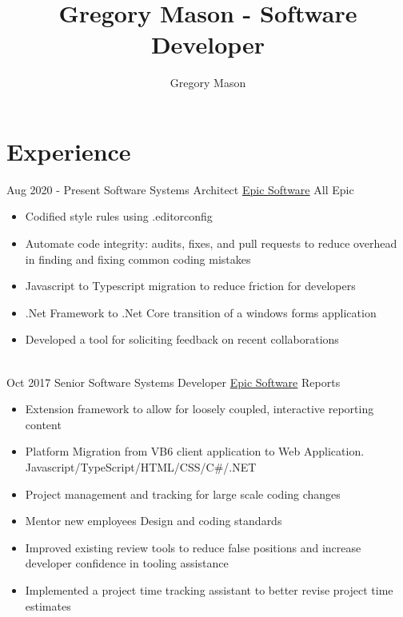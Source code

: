 \documentclass[letterpaper]{twentysecondcv} %
\author{Gregory Mason}
\title{Gregory Mason - Software Developer}
\begin{document}
\makeprofile %


\section{Experience}

\begin{twenty} %
\twentyitem %
{Aug 2020 -}
{Present}
{Software Systems Architect}
{\href{https://www.epic.com/}{Epic Software}}
{All Epic}
{\begin{itemize}
	\item Codified style rules using .editorconfig
	\item Automate code integrity: audits, fixes, and pull requests to reduce overhead in finding and fixing common coding mistakes
	\item Javascript to Typescript migration to reduce friction for developers
	\item .Net Framework to .Net Core transition of a windows forms application
	\item Developed a tool for soliciting feedback on recent collaborations
\end{itemize}}
\\
\twentyitem
{Oct 2017}
{}
{Senior Software Systems Developer}
{\href{https://www.epic.com/}{Epic Software}}
{Reports}
{\begin{itemize}
	\item Extension framework to allow for loosely coupled, interactive reporting content
	\item Platform Migration from VB6 client application to Web Application. Javascript/TypeScript/HTML/CSS/C\#/.NET
	\item Project management and tracking for large scale coding changes
	\item Mentor new employees Design and coding standards
	\item Improved existing review tools to reduce false positions and increase developer confidence in tooling assistance
	\item Implemented a project time tracking assistant to better revise project time estimates
\end{itemize}}
\\	

\end{twenty}
\end{document}
